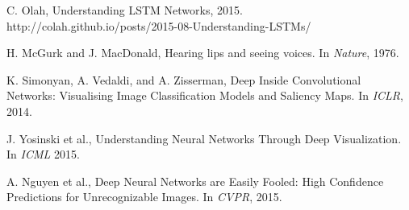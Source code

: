 \begin{thebibliography}{999}
C. Olah, Understanding LSTM Networks, 2015. http://colah.github.io/posts/2015-08-Understanding-LSTMs/

H. McGurk and J. MacDonald, Hearing lips and seeing voices. In \textit{Nature}, 1976.

K. Simonyan, A. Vedaldi, and A. Zisserman, Deep Inside Convolutional Networks: Visualising Image Classification Models and Saliency Maps. In \textit{ICLR}, 2014.

J. Yosinski et al., Understanding Neural Networks Through Deep Visualization. In \textit{ICML} 2015.

A. Nguyen et al., Deep Neural Networks are Easily Fooled: High Confidence Predictions for Unrecognizable Images. In \textit{CVPR}, 2015.

\end{thebibliography}





